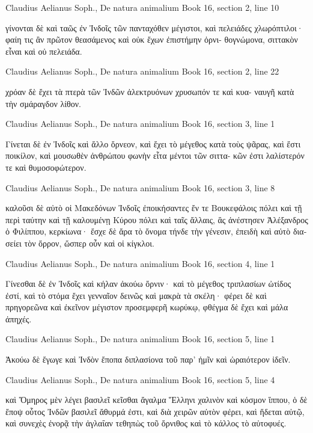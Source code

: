 \documentclass[12pt,letterpaper,twoside,final]{memoir}
\begin{document}
\begin{greek}
Claudius Aelianus Soph., De natura animalium 
Book 16, section 2, line 10

γίνονται δὲ καὶ ταῶς ἐν Ἰνδοῖς τῶν πανταχόθεν 
μέγιστοι, καὶ πελειάδες χλωρόπτιλοι· φαίη τις ἂν 
πρῶτον θεασάμενος καὶ οὐκ ἔχων ἐπιστήμην ὀρνι-
θογνώμονα, σιττακὸν εἶναι καὶ οὐ πελειάδα. 



Claudius Aelianus Soph., De natura animalium 
Book 16, section 2, line 22

                                          χρόαν δὲ ἔχει τὰ 
πτερὰ τῶν Ἰνδῶν ἀλεκτρυόνων χρυσωπόν τε καὶ κυα-
ναυγῆ κατὰ τὴν σμάραγδον λίθον. 



Claudius Aelianus Soph., De natura animalium 
Book 16, section 3, line 1

Γίνεται δὲ ἐν Ἰνδοῖς καὶ ἄλλο ὄρνεον, καὶ ἔχει 
τὸ μέγεθος κατὰ τοὺς ψᾶρας, καὶ ἔστι ποικίλον, καὶ 
μουσωθὲν ἀνθρώπου φωνὴν εἶτα μέντοι τῶν σιττα-
κῶν ἐστι λαλίστερόν τε καὶ θυμοσοφώτερον. 



Claudius Aelianus Soph., De natura animalium 
Book 16, section 3, line 8

               καλοῦσι δὲ αὐτὸ οἱ Μακεδόνων Ἰνδοῖς 
ἐποικήσαντες ἔν τε Βουκεφάλοις πόλει καὶ τῇ περὶ   
ταύτην καὶ τῇ καλουμένῃ Κύρου πόλει καὶ ταῖς ἄλλαις, 
ἃς ἀνέστησεν Ἀλέξανδρος ὁ Φιλίππου, κερκίωνα· 
ἔσχε δὲ ἄρα τὸ ὄνομα τήνδε τὴν γένεσιν, ἐπειδὴ καὶ 
αὐτὸ διασείει τὸν ὄρρον, ὥσπερ οὖν καὶ οἱ κίγκλοι. 



Claudius Aelianus Soph., De natura animalium 
Book 16, section 4, line 1

Γίνεσθαι δὲ ἐν Ἰνδοῖς καὶ κήλαν ἀκούω ὄρνιν· 
καὶ τὸ μέγεθος τριπλασίων ὠτίδος ἐστί, καὶ τὸ στόμα 
ἔχει γενναῖον δεινῶς καὶ μακρὰ τὰ σκέλη· φέρει δὲ 
καὶ πρηγορεῶνα καὶ ἐκεῖνον μέγιστον προσεμφερῆ 
κωρύκῳ, φθέγμα δὲ ἔχει καὶ μάλα ἀπηχές. 



Claudius Aelianus Soph., De natura animalium 
Book 16, section 5, line 1

Ἀκούω δὲ ἔγωγε καὶ Ἰνδὸν ἔποπα διπλασίονα 
τοῦ παρ' ἡμῖν καὶ ὡραιότερον ἰδεῖν. 



Claudius Aelianus Soph., De natura animalium 
Book 16, section 5, line 4

                                            καὶ Ὅμηρος 
μὲν λέγει βασιλεῖ κεῖσθαι ἄγαλμα Ἕλληνι χαλινὸν 
καὶ κόσμον ἵππου, ὁ δὲ ἔποψ οὗτος Ἰνδῶν βασιλεῖ 
ἄθυρμά ἐστι, καὶ διὰ χειρῶν αὐτὸν φέρει, καὶ ἥδεται 
αὐτῷ, καὶ συνεχὲς ἐνορᾷ τὴν ἀγλαΐαν τεθηπὼς τοῦ 
ὄρνιθος καὶ τὸ κάλλος τὸ αὐτοφυές. 




\end{greek}
\end{document}
